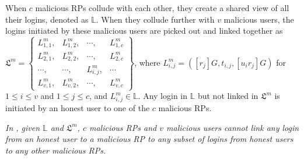   When $c$ malicious RPs collude with each other, they create a shared view of all their logins, denoted as $\mathbb{L}$.
  When they collude further with $v$ malicious users, the logins initiated by these malicious users are picked out and linked together as
  $\mathfrak{L}^m=\left \{ \begin{matrix}
  L^m_{1,1},&L^m_{1,2},&\cdots,&L^m_{1,c}\\
  L^m_{2,1},& L^m_{2,2},&\cdots,&L^m_{2,c}\\
  \cdots,&\cdots,&L^m_{i,j},&\cdots\\
  L^m_{v,1},&L^m_{v,2},&\cdots,&L^m_{v,c}
  \end{matrix}\right\}$,
  where $L^m_{i, j}=([r_j]G, t_{i,j}, [u_ir_j]G)$ for $1 \le i \le v$ and $1 \le j \le c$, and $L^m_{i,j} \in \mathbb{L}$. Any login in $\mathbb{L}$ but not linked in $\mathfrak{L}^m$ is initiated by an honest user to one of the $c$ malicious RPs.


  \begin{theorem}\label{rp-privacy-proof}
  \emph{In \usso, given $\mathbb{L}$ and $\mathfrak{L}^m$, $c$ malicious RPs and $v$ malicious users cannot link any login from an honest user to a malicious RP to any subset of logins from honest users to any other malicious RPs.}
  \end{theorem}


